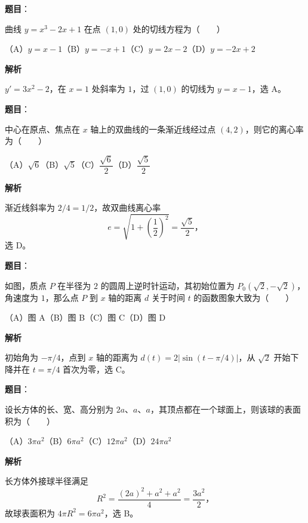 \begin{answer}

\textbf{题目}：

曲线 $y=x^3-2x+1$ 在点 $(1,0)$ 处的切线方程为\mbox{（　　）}

（A）$y=x-1$\quad（B）$y=-x+1$\quad（C）$y=2x-2$\quad（D）$y=-2x+2$

\textbf{解析}

$y'=3x^2-2$，在 $x=1$ 处斜率为 $1$，过 $(1,0)$ 的切线为 $y=x-1$，选 A。


\end{answer}
\begin{answer}

\textbf{题目}：

中心在原点、焦点在 $x$ 轴上的双曲线的一条渐近线经过点 $(4,2)$，则它的离心率为\mbox{（　　）}

（A）$\sqrt6$\quad（B）$\sqrt5$\quad（C）$\dfrac{\sqrt6}{2}$\quad（D）$\dfrac{\sqrt5}{2}$

\textbf{解析}

渐近线斜率为 $2/4=1/2$，故双曲线离心率
\nopagebreak[4]
\[
e=\sqrt{1+\left(\frac12\right)^2}=\frac{\sqrt5}{2}\text{，}
\]
选 D。


\end{answer}
\begin{answer}

\textbf{题目}：

如图，质点 $P$ 在半径为 $2$ 的圆周上逆时针运动，其初始位置为 $P_0(\sqrt2,-\sqrt2)$，角速度为 $1$，那么点 $P$ 到 $x$ 轴的距离 $d$ 关于时间 $t$ 的函数图象大致为\mbox{（　　）}
\nopagebreak[4]
\begin{center}\end{center}
\nopagebreak[4]
（A）图 A\quad（B）图 B\quad（C）图 C\quad（D）图 D

\textbf{解析}

初始角为 $-\pi/4$，点到 $x$ 轴的距离为
$d(t)=2|\sin(t-\pi/4)|$，从 $\sqrt2$ 开始下降并在 $t=\pi/4$ 首次为零，选 C。


\end{answer}
\begin{answer}

\textbf{题目}：

设长方体的长、宽、高分别为 $2a\text{、}a\text{、}a$，其顶点都在一个球面上，则该球的表面积为\mbox{（　　）}

（A）$3\pi a^2$\quad（B）$6\pi a^2$\quad（C）$12\pi a^2$\quad（D）$24\pi a^2$

\textbf{解析}

长方体外接球半径满足
\nopagebreak[4]
\[
R^2=\frac{(2a)^2+a^2+a^2}{4}=\frac{3a^2}{2}\text{，}
\]
故球表面积为 $4\pi R^2=6\pi a^2$，选 B。


\end{answer}
